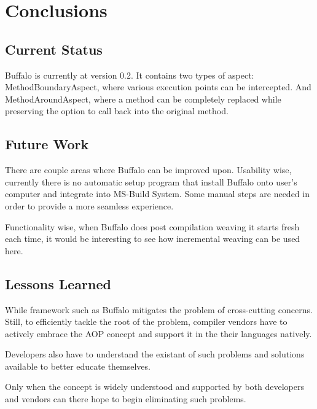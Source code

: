 \chapter{Conclusions}
\section{Current Status}

Buffalo is currently at version 0.2. It contains two types of aspect: MethodBoundaryAspect, where various execution points can be intercepted. And MethodAroundAspect, where a method can be completely replaced while preserving the option to call back into the original method.

\section{Future Work}

There are couple areas where Buffalo can be improved upon. Usability wise, currently there is no automatic setup program that install Buffalo onto user’s computer and integrate into MS-Build System. Some manual steps are needed in order to provide a more seamless experience.

Functionality wise, when Buffalo does post compilation weaving it starts fresh each time, it would be interesting to see how incremental weaving can be used here.

\section{Lessons Learned}

While framework such as Buffalo mitigates the problem of cross-cutting concerns. Still, to efficiently tackle the root of the problem, compiler vendors have to actively embrace the AOP concept and support it in the their languages natively. 

Developers also have to understand the existant of such problems and solutions available to better educate themselves.

Only when the concept is widely understood and supported by both developers and vendors can there hope to begin eliminating such problems.

